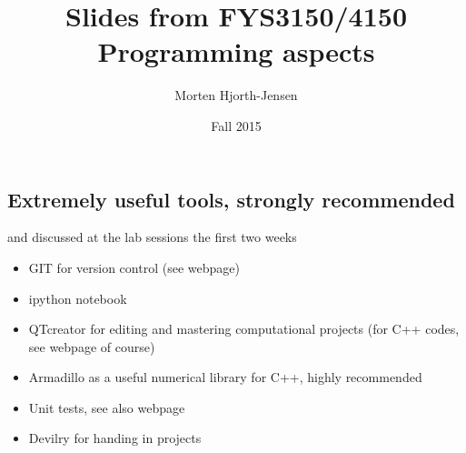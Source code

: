 \documentclass[%
oneside,                 %
final,                   %
10pt]{article}
\begin{document}






\title{Slides from FYS3150/4150 Programming aspects}


\author{Morten Hjorth-Jensen}

\date{Fall 2015
}

\subsection{Extremely useful tools, strongly recommended}

\begin{block}{and discussed at the lab sessions the first two weeks }
\begin{itemize}
  \item GIT for version control (see webpage)

  \item ipython notebook

  \item QTcreator for editing and mastering computational projects (for C++ codes, see webpage of course)

  \item Armadillo as a useful numerical library for C++, highly recommended

  \item Unit tests, see also webpage

  \item Devilry for handing in projects
\end{itemize}

\noindent
\end{block}

\end{document}
